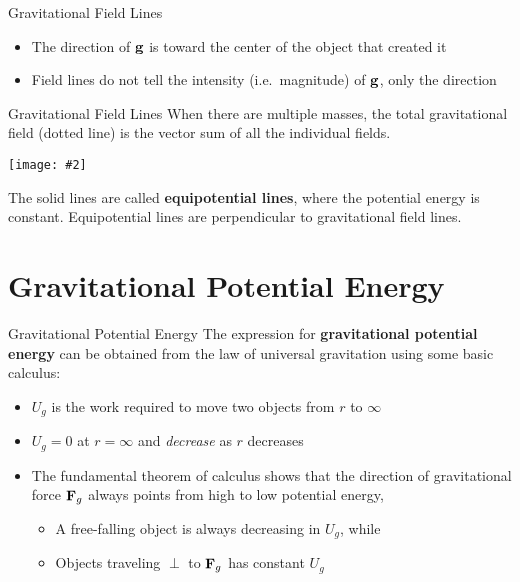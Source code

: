 \documentclass[12pt,compress,aspectratio=169]{beamer}
\newcommand{\pic}[2]{\texttt{[image: \#2]}}
\newcommand{\mb}[1]{\ensuremath\mathbf{#1}}
\newcommand{\eq}[2]{\vspace{#1}{\Large\begin{displaymath}#2\end{displaymath}}}
\begin{document}
\begin{frame}{Gravitational Field Lines}
  \begin{center}
  \end{center}
  \begin{itemize}
  \item The direction of $\mb{g}$ is toward the center of the object that
    created it
  \item Field lines do not tell the intensity (i.e.\ magnitude) of $\mb{g}$,
    only the direction
  \end{itemize}
\end{frame}



\begin{frame}{Gravitational Field Lines}
  When there are multiple masses, the total gravitational field (dotted line)
  is the vector sum of all the individual fields.
  \begin{center}
    \pic{.4}{grav-fields}
  \end{center}
  The solid lines are called \textbf{equipotential lines}, where the potential
  energy is constant. Equipotential lines are perpendicular to
  gravitational field lines.
\end{frame}



\section{Gravitational Potential Energy}

\begin{frame}{Gravitational Potential Energy}
  The expression for \textbf{gravitational potential energy} can be obtained
  from the law of universal gravitation using some basic calculus:

  \eq{-.2in}{
    \boxed{U_g=-G\frac{m_1m_2}{r}}
  }
  \begin{itemize}
  \item $U_g$ is the work required to move two objects from $r$ to $\infty$
  \item $U_g=0$ at $r=\infty$ and \emph{decrease} as $r$ decreases
  \item The fundamental theorem of calculus shows that the direction of
    gravitational force $\mb{F}_g$ always points from high to low potential
    energy,
    \begin{itemize}
    \item A free-falling object is always decreasing in $U_g$, while
    \item Objects traveling $\perp$ to $\mb{F}_g$ has constant $U_g$
    \end{itemize}
  \end{itemize}
\end{frame}
\end{document}
